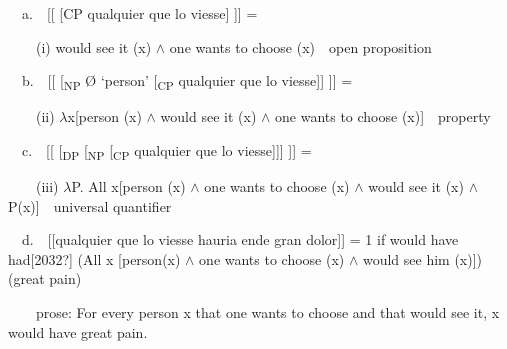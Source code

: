 \begin{styleAuthor}
\ \ a.\ \ [[ [CP qualquier que lo viesse] ]] = \ \ 
\end{styleAuthor}

\begin{styleAuthor}
\ \ \ \ (i) would see it (x) ${\wedge}$ one wants to choose (x)\ \ open proposition
\end{styleAuthor}

\begin{styleStandard}
\ \ b.\ \ [[ [\textsubscript{NP} Ø ‘person’ [\textsubscript{CP }qualquier que lo viesse]] ]] =\textbf{\ \ }
\end{styleStandard}

\begin{styleStandard}
\ \ \ \ (ii) $\lambda $x[person (x) ${\wedge}$ would see it (x) ${\wedge}$ one wants to choose (x)]\ \ property
\end{styleStandard}

\begin{styleStandard}
\ \ c.\ \ [[ [\textsubscript{DP} [\textsubscript{NP} [\textsubscript{CP }qualquier que lo viesse]]] ]] =\ \ 
\end{styleStandard}

\begin{styleStandard}
\ \ \ \ (iii) $\lambda $P. All x[person (x) ${\wedge}$ one wants to choose (x) ${\wedge}$ would see it (x) ${\wedge}$ P(x)]\ \ universal quantifier
\end{styleStandard}

\begin{styleStandard}
\ \ d.\ \ [[qualquier que lo viesse hauria ende gran dolor]] = 1 if would have had[2032?] (All x [person(x) ${\wedge}$ one wants to choose (x) ${\wedge}$ would see him (x)]) (great pain)\ \ 
\end{styleStandard}

\begin{styleStandard}
\ \ \ \ prose: For every person x that one wants to choose and that would see it, x would have great pain.
\end{styleStandard}

